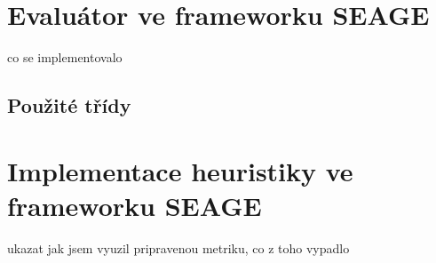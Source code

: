 \section{Evaluátor ve frameworku SEAGE}
co se implementovalo

\subsection{Použité třídy}

\section{Implementace heuristiky ve frameworku SEAGE}
ukazat jak jsem vyuzil pripravenou metriku, co z toho vypadlo
